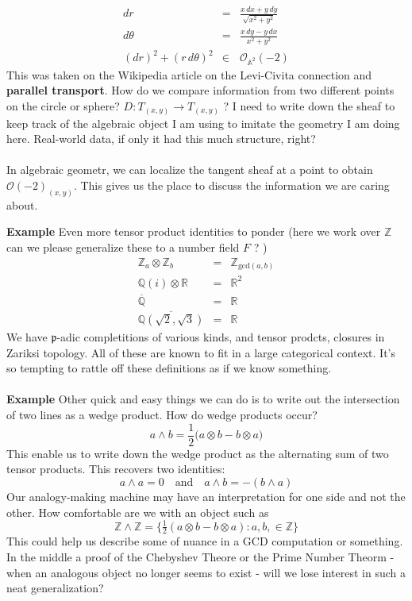 \documentclass[12pt]{article}
\begin{document}
\begin{eqnarray}
dr &=& \frac{x \, dx + y \, dy}{\sqrt{x^2 + y^2}} \\
d\theta &=& \frac{x \, dy - y \, dx}{x^2 + y^2} \\ 
(dr)^2 + (r \, d\theta)^2 &\in & \mathcal{O}_{\mathbb{A}^2}(-2) 
\end{eqnarray}
This was taken on the Wikipedia article on the Levi-Civita connection and \textbf{parallel transport}. How do we compare information from two different points on the circle or sphere? $D: T_{(x,y)} \to T_{(x,y)}$ ? I need to write down the sheaf to keep track of the algebraic object I am using to imitate the geometry I am doing here.  Real-world data, if only it had this much structure, right? \\ \\
In  algebraic geometr, we can localize the tangent sheaf at a point to obtain $\mathcal{O}(-2)_{(x,y)}$.  This gives us the place to discuss the information  we are caring about.

\newpage

\noindent \textbf{Example} Even more tensor product identities to ponder (here we work over $\mathbb{Z}$ can we please generalize these to a number field $F$ ? )
\begin{eqnarray*}
\mathbb{Z}_a \otimes \mathbb{Z}_b&=& \mathbb{Z}_{\text{gcd}(a,b)} \\ 
\mathbb{Q}(i) \otimes \mathbb{R} &=& \mathbb{R}^2 \\ 
\overline{\mathbb{Q}} &=& \mathbb{R} \\ 
\overline{\mathbb{Q}(\sqrt{2}, \sqrt{3})} &=& \mathbb{R}
\end{eqnarray*}
We have $\mathfrak{p}$-adic completitions of various kinds, and tensor prodcts, closures in Zariksi topology.  All of these are known to fit in a large categorical context. It's so tempting to rattle off these definitions as if we know something. \\ \\
\noindent \textbf{Example} Other quick and easy things we can do is to write out the intersection of two lines as a wedge product.  How do wedge products occur?
$$ a \wedge b = \frac{1}{2} \big( a \otimes b - b \otimes a  \big) $$
This enable us to write down the wedge product as the alternating sum of two tensor products.  This recovers two identities:
$$ a \wedge a = 0 \quad\text{and}\quad a \wedge b = - (b \wedge a)$$ 
Our analogy-making machine may have an interpretation for one side and not the other.  How comfortable are we with an object such as 
$$ \mathbb{Z}\wedge \mathbb{Z} = \Big\{ \tfrac{1}{2}(a \otimes b - b \otimes a ) : a, b, \in \mathbb{Z}  \Big\} $$
This could help us describe some of nuance in a GCD computation or something.  In the middle a proof of the Chebyshev Theore or the Prime Number Theorm - when an analogous object no longer seems to exist - will we lose interest in such a neat generalization?
\end{document}
